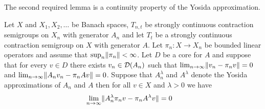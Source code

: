 The second required lemma is a continuity property of the Yosida approximation.
\begin{lem}\label{SCCSYosidaContinuity}Let $X$ and $X_1, X_2, \dotsc$ be Banach spaces, $T_{n,t}$ be strongly continuous contraction semigroups on $X_n$ with generator $A_n$ and let $T_t$ be a strongly continuous contraction semigroup on $X$ with generator $A$.  Let $\pi_n : X \to X_n$ be bounded linear operators and assume that $\sup_{n} \lVert \pi_n \rVert < \infty$.  Let $D$ be a
core for $A$ and suppose that for every $v \in D$ there exists $v_n \in \mathcal{D}(A_n)$ such that $\lim_{n \to \infty} \lVert v_n - \pi_n v \rVert = 0$ and $\lim_{n \to \infty} \lVert A_n v_n - \pi_n A v \rVert = 0$.  Suppose that $A^\lambda_n$ and $A^\lambda$ denote the Yosida approximations of $A_n$ and $A$ then for all $v \in X$ and $\lambda > 0$ we have
\begin{align*}
\lim_{n \to \infty} \lVert A^\lambda_n \pi_n v - \pi_n A^\lambda v \rVert &= 0
\end{align*}
\end{lem}
